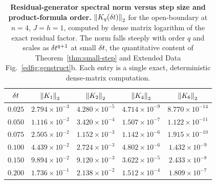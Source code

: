 \begin{table}[t]
\caption{\textbf{Residual-generator spectral norm versus step size and product-formula order.} $\left\lVert K_q(\delta t) \right\rVert_2$ for the open-boundary \tfim{} at $n=4$, $J=h=1$, computed by dense matrix logarithm of the exact residual factor. The norm falls steeply with order $q$ and scales as $\delta t^{q+1}$ at small $\delta t$, the quantitative content of Theorem~\ref{thm:small-step} and Extended Data Fig.~\ref{edfig:genstruct}b. Each entry is a single exact, deterministic dense-matrix computation.}
\label{tab:generator-scaling}
\centering
\begin{tabular}{ccccc}
\toprule
$\delta t$ & $\left\lVert K_1 \right\rVert_2$ & $\left\lVert K_2 \right\rVert_2$ & $\left\lVert K_4 \right\rVert_2$ & $\left\lVert K_6 \right\rVert_2$\\
\midrule
$0.025$ & $2.794\times10^{-3}$ & $4.280\times10^{-5}$ & $4.714\times10^{-9}$ & $8.770\times10^{-14}$\\
$0.050$ & $1.116\times10^{-2}$ & $3.420\times10^{-4}$ & $1.507\times10^{-7}$ & $1.122\times10^{-11}$\\
$0.075$ & $2.505\times10^{-2}$ & $1.152\times10^{-3}$ & $1.142\times10^{-6}$ & $1.915\times10^{-10}$\\
$0.100$ & $4.439\times10^{-2}$ & $2.724\times10^{-3}$ & $4.802\times10^{-6}$ & $1.432\times10^{-9}$\\
$0.150$ & $9.894\times10^{-2}$ & $9.120\times10^{-3}$ & $3.622\times10^{-5}$ & $2.433\times10^{-8}$\\
$0.200$ & $1.736\times10^{-1}$ & $2.138\times10^{-2}$ & $1.512\times10^{-4}$ & $1.809\times10^{-7}$\\
\bottomrule
\end{tabular}
\end{table}
